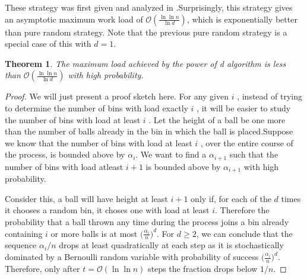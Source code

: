 \documentclass[a4paper,english,12pt]{article}
\newtheorem{theorem}{Theorem}
\begin{document}
These strategy was first given and analyzed in \cite{Azar}.Surprisingly, this strategy gives an asymptotic maximum work load of $\mathcal{O}(\frac{\ln \ln n}{\ln d})$, which is exponentially better than pure random strategy. Note that the previous pure random strategy is a special case of this with $d=1$.
\begin{theorem}
The maximum load achieved by the power of d algorithm is less than $\mathcal{O}(\frac{\ln \ln n}{\ln d})$ with high probability.
\end{theorem}
\begin{proof}
We will just present a proof sketch here. For any given $ i $ , instead of trying to determine the number of bins with
load exactly $ i $ , it will be easier to study the number of bins with load at least $ i $ . Let the height of a ball be one more than the number of balls already in the bin in which the ball is placed.Suppose we know that the number of bins with load at least $ i $ , over the entire course of the process, is bounded above by $\alpha_i$. We want to find a $\alpha_{i+1}$ such that the number of bins with load atleast $i+1$ is bounded above by $\alpha_{i+1}$ with high probability.
\par Consider this, a ball will have height at least $ i + 1 $ only if, for each of the $ d $ times it chooses a random bin, it choses one with load at least $ i $. Therefore the probability that a ball thrown any time during the process joins a bin already containing $ i $ or more balls is at most $\Big(\frac{\alpha_i}{n}\Big)^d$. For $d \geq 2$, we can conclude that the sequence $\alpha_i/n$ drops at least quadratically at each step as it is stochastically dominated by a Bernoulli random variable with probability of success $\Big(\frac{\alpha_i}{n}\Big)^d$. Therefore, only after $t = \mathcal{O}(\ln \ln n)$ steps the fraction drops below $1/n$. 
\end{proof}
\end{document}
